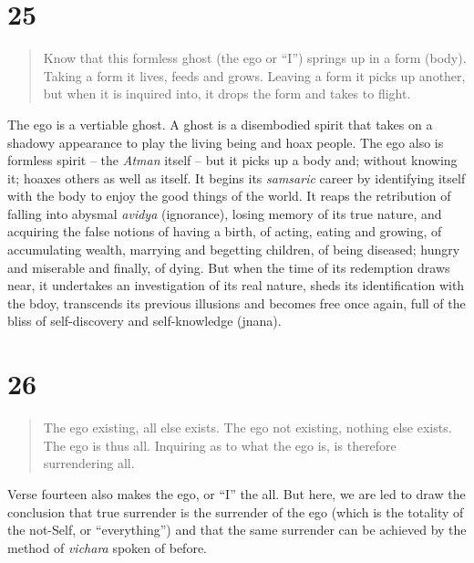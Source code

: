 \documentclass[12pt]{report}
\begin{document}
\section{25}


\begin{quote}
  Know that this formless ghost (the ego or ``I'') springs up in a form
  (body). Taking a form it lives, feeds and grows. Leaving a form it
  picks up another, but when it is inquired into, it drops the form and
  takes to flight.
\end{quote}

The ego is a vertiable ghost. A ghost is a disembodied spirit that
takes on a shadowy appearance to play the living being and hoax
people. The ego also is formless spirit -- the \emph{Atman} itself --
but it picks up a body and; without knowing it; hoaxes others as well
as itself. It begins its \emph{samsaric} career by identifying itself
with the body to enjoy the good things of the world. It reaps the
retribution of falling into abysmal \emph{avidya} (ignorance), losing
memory of its true nature, and acquiring the false notions of having a
birth, of acting, eating and growing, of accumulating wealth, marrying
and begetting children, of being diseased; hungry and miserable and
finally, of dying. But when the time of its redemption draws near, it
undertakes an investigation of its real nature, sheds its
identification with the bdoy, transcends its previous illusions and
becomes free once again, full of the bliss of self-discovery and
self-knowledge (jnana). 


\section{26}

\begin{quote}
  The ego existing, all else exists. The ego not existing, nothing
  else exists. The ego is thus all. Inquiring as to what the ego is,
  is therefore surrendering all.
\end{quote}

Verse fourteen also makes the ego, or ``I'' the all. But here, we are
led to draw the conclusion that true surrender is the surrender of the
ego (which is the totality of the not-Self, or ``everything'') and
that the same surrender can be achieved by the method of
\emph{vichara} spoken of before.

\end{document}
